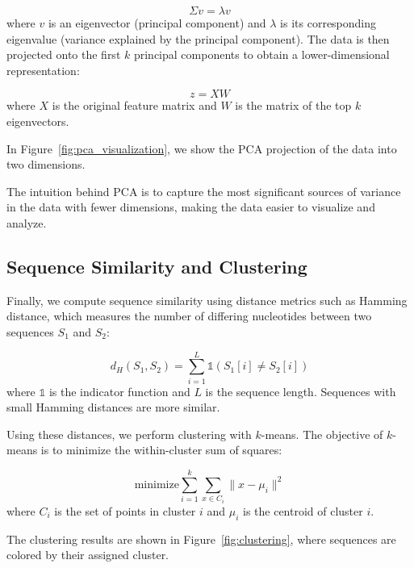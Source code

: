     \[
      \Sigma v = \lambda v
    \]
    where \( v \) is an eigenvector (principal component) and \( \lambda \) is its corresponding eigenvalue (variance explained by the principal component). The data is then projected onto the first \( k \) principal components to obtain a lower-dimensional representation:

    \[
      z = X W
    \]
    where \( X \) is the original feature matrix and \( W \) is the matrix of the top \( k \) eigenvectors.

    In Figure~\ref{fig:pca_visualization}, we show the PCA projection of the data into two dimensions.


    The intuition behind PCA is to capture the most significant sources of variance in the data with fewer dimensions, making the data easier to visualize and analyze.

  \subsection{Sequence Similarity and Clustering}\label{subsec:sequence-similarity-and-clustering}
    Finally, we compute sequence similarity using distance metrics such as Hamming distance, which measures the number of differing nucleotides between two sequences \( S_1 \) and \( S_2 \):

    \[
      d_H(S_1, S_2) = \sum_{i=1}^{L} \mathbb{1}(S_1[i] \neq S_2[i])
    \]
    where \( \mathbb{1} \) is the indicator function and \( L \) is the sequence length. Sequences with small Hamming distances are more similar.

    Using these distances, we perform clustering with \( k \)-means. The objective of \( k \)-means is to minimize the within-cluster sum of squares:

    \[
      \text{minimize} \sum_{i=1}^{k} \sum_{x \in C_i} \|x - \mu_i\|^2
    \]
    where \( C_i \) is the set of points in cluster \( i \) and \( \mu_i \) is the centroid of cluster \( i \).

    The clustering results are shown in Figure~\ref{fig:clustering}, where sequences are colored by their assigned cluster.


